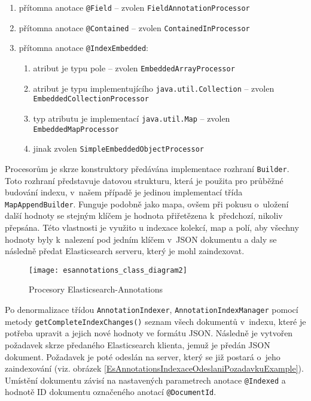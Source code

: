 \documentclass[11pt,oneside]{fithesis2}
\begin{document}
\begin{enumerate}
	\item přítomna anotace \texttt{@Field} -- zvolen \texttt{FieldAnnotationProcessor}
	\item přítomna anotace \texttt{@Contained} -- zvolen \texttt{ContainedInProcessor}
	\item přítomna anotace \texttt{@IndexEmbedded}:
	\begin{enumerate}
		\item atribut je typu pole -- zvolen \texttt{EmbeddedArrayProcessor}  
		\item atribut je typu implementujícího \texttt{java.util.Collection} -- zvolen \texttt{EmbeddedCollectionProcessor}  
		\item typ atributu je implementací \texttt{java.util.Map} -- zvolen \\ \texttt{EmbeddedMapProcessor} 
		\item jinak zvolen \texttt{SimpleEmbeddedObjectProcessor} 
	\end{enumerate}
\end{enumerate}

Procesorům je skrze konstruktory předávána implementace rozhraní \texttt{Builder}. Toto rozhraní představuje datovou strukturu, která je použita pro průběžné budování indexu, v~našem případě je jedinou implementací třída \texttt{MapAppendBuilder}. Funguje podobně jako mapa, ovšem při pokusu o~uložení další hodnoty se stejným klíčem je hodnota přiřetězena k~předchozí, nikoliv přepsána. Této vlastnosti je využito u indexace kolekcí, map a polí, aby všechny hodnoty byly k~nalezení pod jedním klíčem v~JSON dokumentu a daly se následně předat Elasticsearch serveru, který je mohl zaindexovat. 

\begin{figure}[htp]
	\begin{center}
		\texttt{[image: esannotations\_class\_diagram2]}
	\end{center}
	\caption{Procesory Elasticsearch-Annotations}	
	\label{EsAnnotationsIndexaceArchitektura2}
\end{figure}

Po denormalizace třídou \texttt{AnnotationIndexer}, \texttt{AnnotationIndexManager} pomocí metody \texttt{getCompleteIndexChanges()} seznam všech dokumentů v~indexu, které je potřeba upravit a jejich nové hodnoty ve formátu JSON. Následně je vytvořen požadavek skrze předaného Elasticsearch klienta, jemuž je předán JSON dokument. Požadavek je poté odeslán na server, který se již postará o~jeho zaindexování (viz. obrázek \ref{EsAnnotationsIndexaceOdeslaniPozadavkuExample}). Umístění dokumentu závisí na nastavených parametrech anotace \texttt{@Indexed} a hodnotě ID dokumentu označeného anotací \texttt{@DocumentId}.
\end{document}

